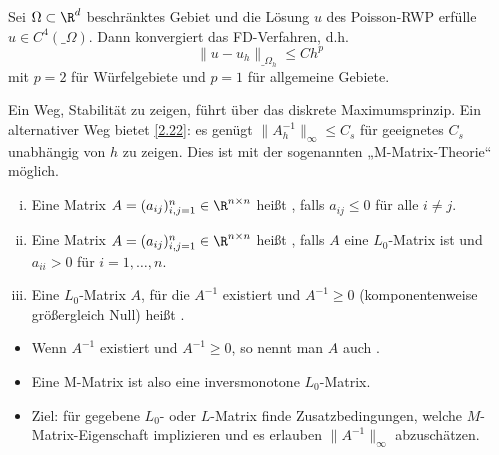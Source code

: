 \begin{kor} \label{2.26}
	Sei $\Omega \subset \R^d$ beschränktes Gebiet und die Lösung $u$ des Poisson-RWP erfülle $u \in C^4(\_\Omega)$.
	Dann konvergiert das FD-Verfahren, d.h.
	\[
		\|u - u_h\|_{\_\Omega_h}
		\le C h^p
	\]
	mit $p = 2$ für Würfelgebiete und $p = 1$ für allgemeine Gebiete.
\end{kor}

Ein Weg, Stabilität zu zeigen, führt über das diskrete Maximumsprinzip.
Ein alternativer Weg bietet \ref{2.22}:
es genügt $\|A_h^{-1}\|_\infty \le C_s$ für geeignetes $C_s$ unabhängig von $h$ zu zeigen.
Dies ist mit der sogenannten „M-Matrix-Theorie“ möglich.

\begin{df} \label{2.27}
	\begin{enumerate}[i)]
		\item
			Eine Matrix $A = (a_{ij})_{i,j=1}^n \in \R^{n\times n}$ heißt , falls $a_{ij} \le 0$ für alle $i \neq j$.
		\item
			Eine Matrix $A = (a_{ij})_{i,j=1}^n \in \R^{n\times n}$ heißt , falls $A$ eine $L_0$-Matrix ist und $a_{ii} > 0$ für $i= 1, \dotsc, n$.
		\item
			Eine $L_0$-Matrix $A$, für die $A^{-1}$ existiert und $A^{-1} \ge 0$ (komponentenweise größergleich Null) heißt .
	\end{enumerate}
	\begin{note}
		\begin{itemize}
			\item
				Wenn $A^{-1}$ existiert und $A^{-1} \ge 0$, so nennt man $A$ auch .
			\item
				Eine M-Matrix ist also eine inversmonotone $L_0$-Matrix.
			\item
				Ziel: für gegebene $L_0$- oder $L$-Matrix finde Zusatzbedingungen, welche $M$-Matrix-Eigenschaft implizieren und es erlauben $\|A^{-1}\|_\infty$ abzuschätzen.
		\end{itemize}
	\end{note}
\end{df}

